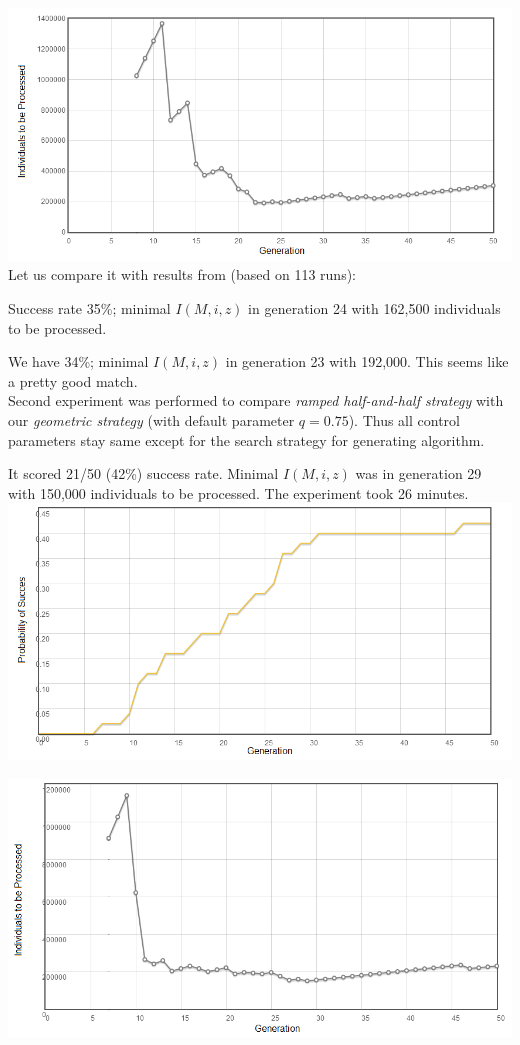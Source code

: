 \documentclass[12pt,a4paper]{report}
\newcommand{\Lets}{Let us\xspace}
\begin{document}
\includegraphics[scale=0.65]{reports/SSR/1/indivs.png}\\

\Lets compare it with results from \cite{koza92} (based on 113 runs):

Success rate 35\%; minimal $I(M,i,z)$ in generation 24 
with 162,500 individuals to be processed.

We have 34\%; minimal $I(M,i,z)$ in generation 23 
with 192,000. This seems like a pretty good match.
\\



Second experiment was performed to compare 
\textit{ramped half-and-half strategy} with our
\textit{geometric strategy} (with default parameter $q=0.75$). 
Thus all control parameters stay same except for the 
search strategy for generating algorithm.

It scored 21/50 (42\%) success rate. 
Minimal $I(M,i,z)$ was in generation 29 
with 150,000 individuals to be processed.
The experiment took 26 minutes.\\


\includegraphics[scale=0.65]{reports/SSR/2/probabs.png}

\includegraphics[scale=0.65]{reports/SSR/2/indivs.png}\\
\end{document}
